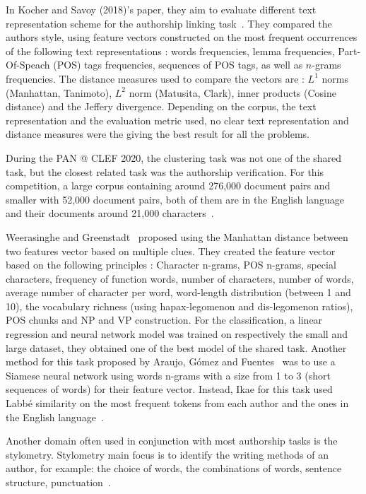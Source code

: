 In Kocher and Savoy (2018)'s paper, they aim to evaluate different text representation scheme for the authorship linking task~\cite{kocher_linking}.
They compared the authors style, using feature vectors constructed on the most frequent occurrences of the following text representations : words frequencies, lemma frequencies, Part-Of-Speach (POS) tags frequencies, sequences of POS tags, as well as $n$-grams frequencies.
The distance measures used to compare the vectors are : $L^1$ norms (Manhattan, Tanimoto), $L^2$ norm (Matusita, Clark), inner products (Cosine distance) and the Jeffery divergence.
Depending on the corpus, the text representation and the evaluation metric used, no clear text representation and distance measures were the giving the best result for all the problems.

During the PAN @ CLEF 2020, the clustering task was not one of the shared task, but the closest related task was the authorship verification.
For this competition, a large corpus containing around 276,000 document pairs and smaller with 52,000 document pairs, both of them are in the English language and their documents around 21,000 characters~\cite{overview_pan20}.

Weerasinghe and Greenstadt~\cite{feature_vector_pan20} proposed using the Manhattan distance between two features vector based on multiple clues.
They created the feature vector based on the following principles : Character n-grams, POS n-grams, special characters, frequency of function words, number of characters, number of words, average number of character per word, word-length distribution (between 1 and 10), the vocabulary richness (using hapax-legomenon and dis-legomenon ratios), POS chunks and NP and VP construction.
For the classification, a linear regression and neural network model was trained on respectively the small and large dataset, they obtained one of the best model of the shared task.
Another method for this task proposed by Araujo, Gómez and Fuentes~\cite{siamese_network_pan20} was to use a Siamese neural network using words n-grams with a size from 1 to 3 (short sequences of words) for their feature vector.
Instead, Ikae for this task used Labbé similarity on the most frequent tokens from each author and the ones in the English language~\cite{unine_pan20_verif}.

Another domain often used in conjunction with most authorship tasks is the stylometry.
Stylometry main focus is to identify the writing methods of an author, for example: the choice of words, the combinations of words, sentence structure, punctuation~\cite{savoy_stylo}.
